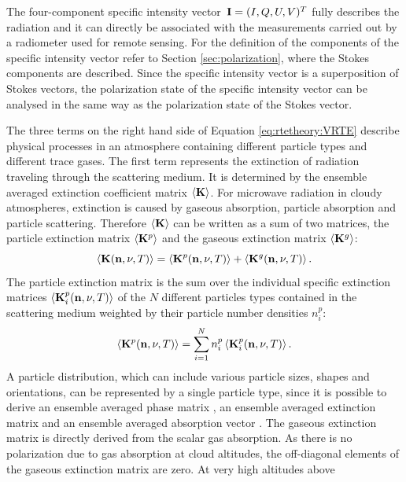 The four-component specific intensity vector~${\bf I} = (I,Q,U,V)^T$
fully describes the radiation and it can directly be associated with
the measurements carried out by a radiometer used for remote sensing.
For the definition of the components of the specific intensity vector
refer to Section \ref{sec:polarization}, where the Stokes
components are described. Since the specific intensity vector is a
superposition of Stokes vectors, the polarization state of the
specific intensity vector can be analysed in the same way as the
polarization state of the Stokes vector.

The three terms on the right hand side of Equation \ref{eq:rtetheory:VRTE} describe
physical processes in an atmosphere containing different particle
types and different trace gases. The first term represents the
extinction of radiation traveling through the scattering medium. It is
determined by the ensemble averaged extinction coefficient matrix
$\left\langle {\bf K} \right\rangle$.  For microwave radiation in cloudy
atmospheres, extinction is caused by gaseous absorption, particle
absorption and particle scattering. Therefore $\left\langle {\bf K} \right\rangle$
can be written as a sum of two matrices, the particle extinction
matrix $\left\langle {\bf K}^{p} \right\rangle$ and the gaseous extinction matrix
$\left\langle {\bf K}^{g} \right\rangle$:
\begin{equation}
  \left\langle {\bf K}({\bf n}, \nu, T) \right\rangle =
  \left\langle {\bf K}^{p}({\bf n}, \nu, T) \right\rangle+
  \left\langle {\bf K}^{g}({\bf n}, \nu, T) \right\rangle.
\end{equation}
The particle extinction matrix is the sum over the individual specific
extinction matrices $\left\langle {\bf K}_i^p({\bf n}, \nu, T) \right\rangle$ of
the $N$ different particles types contained in the scattering medium
weighted by their particle number densities $n^p_i$:
\begin{equation}
  \left\langle {\bf K}^{p}({\bf n}, \nu, T) \right\rangle =
  \sum_{i=1}^N n^p_i \left\langle {\bf K}_i^p ({\bf n}, \nu, T) \right\rangle.
\label{eq:rtetheory:ext_mat_p}
\end{equation}
A particle distribution, which can include various particle sizes,
shapes and orientations, can be represented by a single particle type,
since it is possible to derive an ensemble averaged phase matrix
, an ensemble averaged extinction matrix
 and an ensemble averaged absorption vector
.  The gaseous extinction matrix is directly derived
from the scalar gas absorption. As there is no polarization due to gas
absorption at cloud altitudes, the off-diagonal elements of the
gaseous extinction matrix are zero. At very high altitudes above
